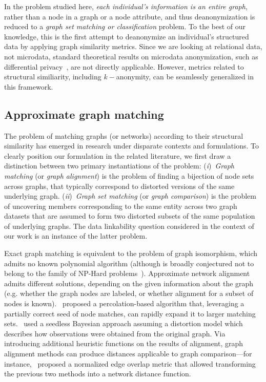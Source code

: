 In the problem studied here, \emph{each individual's information is an entire graph}, rather than a node in a graph or a node attribute, and thus deanonymization is reduced to a \emph{graph set matching or classification} problem.
To the best of our knowledge, this is the first attempt to deanonymize an individual's structured data by applying graph similarity metrics.
Since we are looking at relational data, not microdata, standard theoretical results on microdata anonymization, such as differential privacy~\citep{dwork2006calibrating}, are not directly applicable.
However, metrics related to structural similiarity, including $k-$anonymity, can be seamlessly generalized in this framework.

\subsection{Approximate graph matching}
The problem of matching graphs (or networks) according to their structural similarity has emerged in research under disparate contexts and formulations. To clearly position our formulation in the related literature, we first draw a distinction between two primary instantiations of the problem: (\emph{i})~\emph{Graph matching} (or \emph{graph alignment}) is the problem of finding a bijection of node sets across graphs, that typically correspond to distorted versions of the same underlying graph. (\emph{ii})~\emph{Graph set matching} (or \emph{graph comparison}) is the problem of uncovering members corresponding to the same entity across two graph datasets that are assumed to form two distorted subsets of the same population of underlying graphs. The data linkability question considered in the context of our work is an instance of the latter problem.

Exact graph matching is equivalent to the problem of graph isomorphism, which admits no known polynomial algorithm (although is broadly conjectured not to belong to the family of NP-Hard problems~\citep{schoening88}). Approximate network alignment admits different solutions, depending on the given information about the graph (e.g. whether the graph nodes are labeled, or whether alignment for a subset of nodes is known).~ proposed a percolation-based algorithm that, leveraging a partially correct seed of node matches, can rapidly expand it to larger matching sets.~ used a seedless Bayesian approach assuming a distortion model which describes how observations were obtained from the original graph. Via introducing additional heuristic functions on the results of alignment, graph alignment methods can produce distances applicable to graph comparison---for instance,~ proposed a normalized edge overlap metric that allowed transforming the previous two methods into a network distance function.

